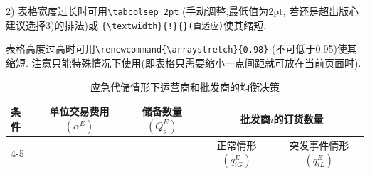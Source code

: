 \documentclass{setp-new}
\begin{document}
2) 表格宽度过长时可用\verb|\tabcolsep 2pt| (手动调整,最低值为2pt, 若还是超出版心建议选择3)的排法)或
\verb|{\textwidth}{!}{}(自适应)|使其缩短.


表格高度过高时可用\verb|\renewcommand{\arraystretch}{0.98}| (不可低于0.95)使其缩短. 注意只能特殊情况下使用(即表格只需要缩小一点间距就可放在当前页面时).


\begin{table}[H]
\centering
\caption{应急代储情形下运营商和批发商的均衡决策}%
\tabcolsep 3pt
\renewcommand{\arraystretch}{0.98}
\begin{tabular}{lcccc} \toprule
     \multirow{2}{*}{条件} & \multirow{2}{*}{单位交易费用$(\alpha^{E})$} &  \multirow{2}{*}{储备数量$(Q_{s}^{E})$} & \multicolumn{2}{c}{批发商$i$的订货数量}  \\\cmidrule(r){4-5}
     &&& 正常情形$(q_{iG}^{E})$ & 突发事件情形$(q_{iL}^{E})$ \\


\end{tabular}
\end{table}
\end{document}
